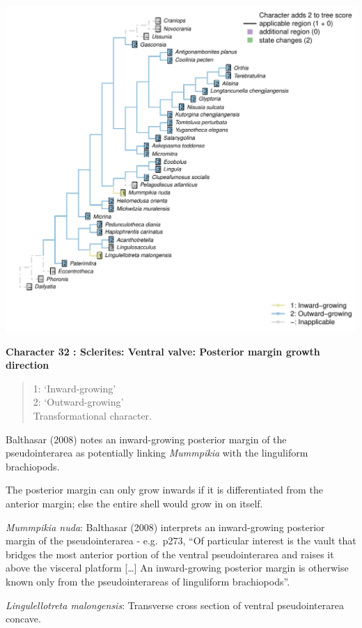 \documentclass[]{book}
\theoremstyle{definition}
\theoremstyle{definition}
\theoremstyle{definition}
\theoremstyle{remark}
\begin{document}
\includegraphics{Brachiopod_phylogeny_files/figure-latex/unnamed-chunk-5-32.pdf}

\textbf{Character 32 : Sclerites: Ventral valve: Posterior margin growth
direction }

\begin{quote}
1: `Inward-growing'\\
2: `Outward-growing'\\
Transformational character.
\end{quote}

Balthasar (2008) notes an inward-growing posterior margin of the
pseudointerarea as potentially linking \emph{Mummpikia} with the
linguliform brachiopods.

The posterior margin can only grow inwards if it is differentiated from
the anterior margin; else the entire shell would grow in on itself.

\emph{Mummpikia nuda}: Balthasar (2008) interprets an inward-growing
posterior margin of the pseudointerarea - e.g.~p273, ``Of particular
interest is the vault that bridges the most anterior portion of the
ventral pseudointerarea and raises it above the visceral platform
{[}\ldots{}{]} An inward-growing posterior margin is otherwise known
only from the pseudointerareas of linguliform brachiopods''.

\emph{Lingulellotreta malongensis}: Transverse cross section of ventral
pseudointerarea concave.
\end{document}
